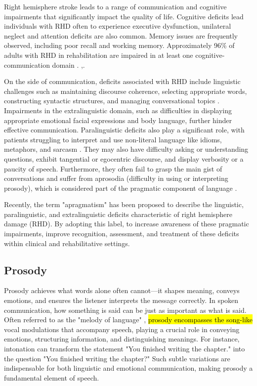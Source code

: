 Right hemisphere stroke leads to a range of communication and cognitive impairments that significantly impact the quality of life. 
Cognitive deficits lead individuals with RHD often to experience executive dysfunction, unilateral neglect and attention deficits are also common. Memory issues are frequently observed, including poor recall and working memory.
Approximately 96\% of adults with RHD in rehabilitation are impaired in at least one cognitive-communication domain \cite{blake_prevalence_2002}. ,\cite{tompkins_nature_2012}.

On the side of communication, deficits associated with RHD include linguistic challenges such as maintaining discourse coherence, selecting appropriate words, constructing syntactic structures, and managing conversational topics \cite{davis_referential_1997}. Impairments in the extralinguistic domain, such as difficulties in displaying appropriate emotional facial expressions and body language, further hinder effective communication. Paralinguistic deficits also play a significant role, with patients struggling to interpret and use non-literal language like idioms, metaphors, and sarcasm \cite{noauthor_spontaneous_nodate}. They may also have difficulty asking or understanding questions, exhibit tangential or egocentric discourse, and display verbosity or a paucity of speech. Furthermore, they often fail to grasp the main gist of conversations and suffer from aprosodia (difficulty in using or interpreting prosody), which is considered part of the pragmatic component of language \cite{stockbridge_aprosodia_2022, ukaegbe_aprosodia_2022}.

Recently, the term "apragmatism" has been proposed to describe the linguistic, paralinguistic, and extralinguistic deficits characteristic of right hemisphere damage (RHD). By adopting this label, to increase awareness of these pragmatic impairments, improve recognition, assessment, and treatment of these deficits within clinical and rehabilitative settings. \cite{minga_apragmatism_2023}


\subsection{Prosody} 
Prosody achieves what words alone often cannot—it shapes meaning, conveys emotions, and ensures the listener interprets the message correctly. In spoken communication, how something is said can be just as important as what is said. Often referred to as the "melody of language" \cite{hellerman_ann_2003}, \hl{prosody encompasses the song-like} vocal modulations that accompany speech, playing a crucial role in conveying emotions, structuring information, and distinguishing meanings. For instance, intonation can transform the statement "You finished writing the chapter." into the question "You finished writing the chapter?" Such subtle variations are indispensable for both linguistic and emotional communication, making prosody a fundamental element of speech.

